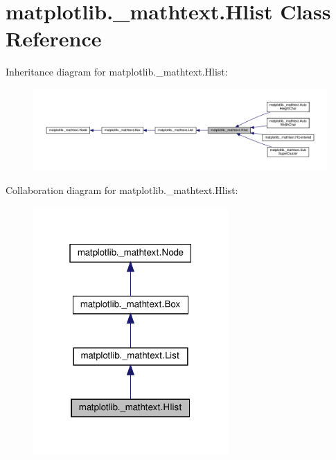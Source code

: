 \hypertarget{classmatplotlib_1_1__mathtext_1_1Hlist}{}\section{matplotlib.\+\_\+mathtext.\+Hlist Class Reference}
\label{classmatplotlib_1_1__mathtext_1_1Hlist}


Inheritance diagram for matplotlib.\+\_\+mathtext.\+Hlist\+:
\nopagebreak
\begin{figure}[H]
\begin{center}
\leavevmode
\includegraphics[width=350pt]{classmatplotlib_1_1__mathtext_1_1Hlist__inherit__graph}
\end{center}
\end{figure}


Collaboration diagram for matplotlib.\+\_\+mathtext.\+Hlist\+:
\nopagebreak
\begin{figure}[H]
\begin{center}
\leavevmode
\includegraphics[width=211pt]{classmatplotlib_1_1__mathtext_1_1Hlist__coll__graph}
\end{center}
\end{figure}

